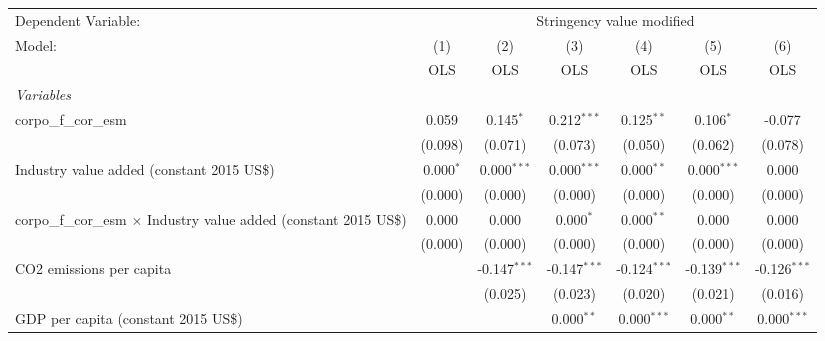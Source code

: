 
\begingroup
\centering
\begin{tabular}{lcccccc}
   \toprule
   Dependent Variable: & \multicolumn{6}{c}{Stringency value modified}\\
   Model:                                                                     & (1)         & (2)            & (3)            & (4)            & (5)            & (6)\\  
                                                                              &  OLS        & OLS            & OLS            & OLS            & OLS            & OLS\\  
   \midrule
   \emph{Variables}\\
   corpo\_f\_cor\_esm                                                         & 0.059       & 0.145$^{*}$    & 0.212$^{***}$  & 0.125$^{**}$   & 0.106$^{*}$    & -0.077\\   
                                                                              & (0.098)     & (0.071)        & (0.073)        & (0.050)        & (0.062)        & (0.078)\\   
   Industry value added (constant 2015 US\$)                                  & 0.000$^{*}$ & 0.000$^{***}$  & 0.000$^{***}$  & 0.000$^{**}$   & 0.000$^{***}$  & 0.000\\   
                                                                              & (0.000)     & (0.000)        & (0.000)        & (0.000)        & (0.000)        & (0.000)\\   
   corpo\_f\_cor\_esm $\times$ Industry value added (constant 2015 US\$)      & 0.000       & 0.000          & 0.000$^{*}$    & 0.000$^{**}$   & 0.000          & 0.000\\   
                                                                              & (0.000)     & (0.000)        & (0.000)        & (0.000)        & (0.000)        & (0.000)\\   
   CO2 emissions per capita                                                   &             & -0.147$^{***}$ & -0.147$^{***}$ & -0.124$^{***}$ & -0.139$^{***}$ & -0.126$^{***}$\\   
                                                                              &             & (0.025)        & (0.023)        & (0.020)        & (0.021)        & (0.016)\\   
   GDP per capita (constant 2015 US\$)                                        &             &                & 0.000$^{**}$   & 0.000$^{***}$  & 0.000$^{**}$   & 0.000$^{***}$\\   

\end{tabular}
